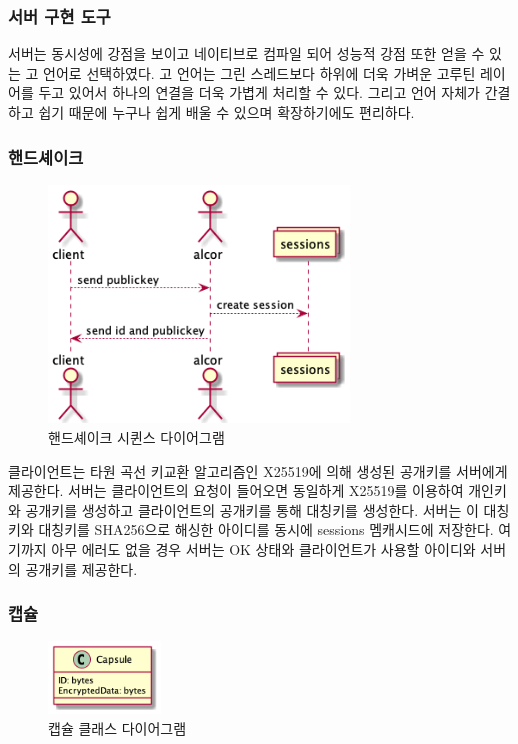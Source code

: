 \documentclass[10pt,a4paper,left=15mm,right=15mm,top=20mm,bottom=20mm]{article}
\begin{document}
    \subsubsection{서버 구현 도구}

    서버는 동시성에 강점을 보이고 네이티브로 컴파일 되어 성능적 강점 또한 얻을 수 있는 고 언어로 선택하였다. 고 언어는 그린 스레드보다 하위에 더욱 가벼운 고루틴 레이어를 두고 있어서 하나의 연결을 더욱 가볍게 처리할 수 있다. 그리고 언어 자체가 간결하고 쉽기 때문에 누구나 쉽게 배울 수 있으며 확장하기에도 편리하다.

    \subsubsection{핸드셰이크}

    \begin{figure}[h]
        \begin{center}
            \includegraphics[width=8cm]{handshake}
            \caption{핸드셰이크 시퀸스 다이어그램}
        \end{center}
    \end{figure}

    클라이언트는 타원 곡선 키교환 알고리즘인 X25519에 의해 생성된 공개키를 서버에게 제공한다. 서버는 클라이언트의 요청이 들어오면 동일하게 X25519를 이용하여 개인키와 공개키를 생성하고 클라이언트의 공개키를 통해 대칭키를 생성한다. 서버는 이 대칭키와 대칭키를 SHA256으로 해싱한 아이디를 동시에 sessions 멤캐시드에 저장한다. 여기까지 아무 에러도 없을 경우 서버는 OK 상태와 클라이언트가 사용할 아이디와 서버의 공개키를 제공한다.

    \subsubsection{캡슐}

    \begin{figure}[h]
        \begin{center}
            \includegraphics[width=3cm]{capsule}
            \caption{캡슐 클래스 다이어그램}
        \end{center}
    \end{figure}
\end{document}
